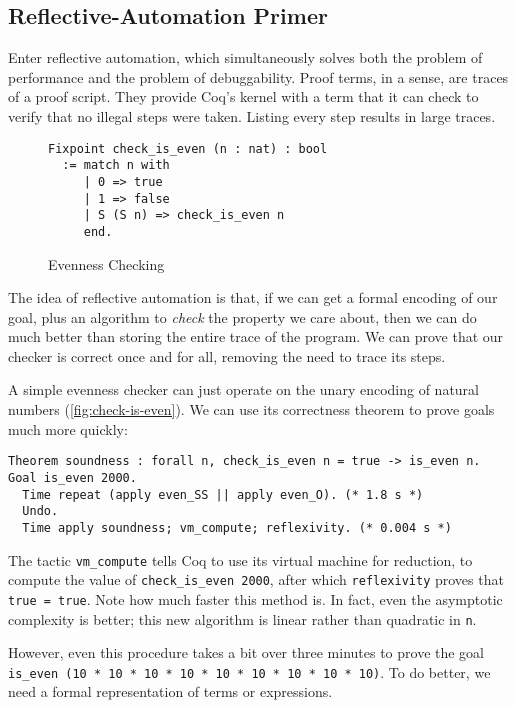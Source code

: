 \subsection{Reflective-Automation Primer}\label{sec:evenness}
Enter reflective automation, which simultaneously solves both the problem of performance and the problem of debuggability.
Proof terms, in a sense, are traces of a proof script.
They provide Coq's kernel with a term that it can check to verify that no illegal steps were taken.
Listing every step results in large traces.

\begin{wrapfigure}[9]{r}{6cm}
\begin{verbatim}
Fixpoint check_is_even (n : nat) : bool
  := match n with
     | 0 => true
     | 1 => false
     | S (S n) => check_is_even n
     end.
\end{verbatim}
\caption{Evenness Checking}\label{fig:check-is-even}
\end{wrapfigure}
The idea of reflective automation is that, if we can get a formal encoding of our goal, plus an algorithm to \emph{check} the property we care about, then we can do much better than storing the entire trace of the program.
We can prove that our checker is correct once and for all, removing the need to trace its steps.

A simple evenness checker can just operate on the unary encoding of natural numbers (\autoref{fig:check-is-even}).
We can use its correctness theorem to prove goals much more quickly:
\begin{verbatim}
Theorem soundness : forall n, check_is_even n = true -> is_even n.
Goal is_even 2000.
  Time repeat (apply even_SS || apply even_O). (* 1.8 s *)
  Undo.
  Time apply soundness; vm_compute; reflexivity. (* 0.004 s *)
\end{verbatim}
The tactic \texttt{vm_compute} tells Coq to use its virtual machine for reduction, to compute the value of \texttt{check_is_even 2000}, after which \texttt{reflexivity} proves that \texttt{true = true}.
Note how much faster this method is.
In fact, even the asymptotic complexity is better; this new algorithm is linear rather than quadratic in \texttt{n}.

However, even this procedure takes a bit over three minutes to prove the goal \texttt{is_even (10 * 10 * 10 * 10 * 10 * 10 * 10 * 10 * 10)}.
To do better, we need a formal representation of terms or expressions.

